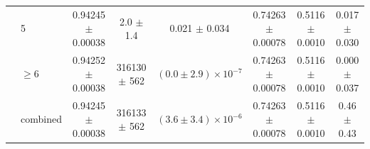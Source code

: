 \begin{table}
\begin{tiny}
\begin{tabular}{llcccccc}
 & 5 & 0.94245 $\pm$ 0.00038 & 2.0 $\pm$ 1.4 & 0.021 $\pm$ 0.034 & 0.74263 $\pm$ 0.00078 & 0.5116 $\pm$ 0.0010 & 0.017 $\pm$ 0.030 \\
 & $\geq 6$ & 0.94252 $\pm$ 0.00038 & 316130 $\pm$ 562 & $(0.0 \pm 2.9) \times 10^{-7}$ & 0.74263 $\pm$ 0.00078 & 0.5116 $\pm$ 0.0010 & 0.000 $\pm$ 0.037 \\
 & combined & 0.94245 $\pm$ 0.00038 & 316133 $\pm$ 562 & $(3.6 \pm 3.4) \times 10^{-6}$ & 0.74263 $\pm$ 0.00078 & 0.5116 $\pm$ 0.0010 & 0.46 $\pm$ 0.43 \\
\hline
\end{tabular}
\end{tiny}
\end{table}
